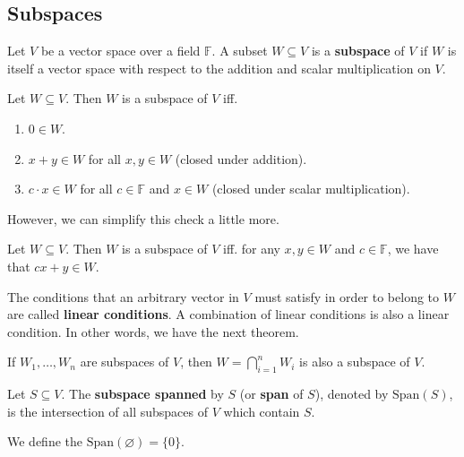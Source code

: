 \subsection{Subspaces}

\begin{definition}[Subspace]
	Let $V$ be a vector space over a field $\mathbb{F}$. A subset $W \subseteq V$ is a \textbf{subspace} of $V$ if $W$ is itself a vector space with respect to the addition and scalar multiplication on $V$.	
\end{definition}

\begin{theorem}
	Let $W \subseteq V$. Then $W$ is a subspace of $V$ iff.
	\begin{enumerate}
		\item $0 \in W$.
		\item $x+y \in W$ for all $x,y \in W$ (closed under addition).
		\item $c \cdot x \in W$ for all $c \in \mathbb{F}$ and $x \in W$ (closed under scalar multiplication).
	\end{enumerate}
\end{theorem}

However, we can simplify this check a little more.

\begin{theorem}
	Let $W \subseteq V$. Then $W$ is a subspace of $V$ iff. for any $x, y \in W$ and $c \in \mathbb{F}$, we have that $cx+y \in W$.
\end{theorem}

The conditions that an arbitrary vector in $V$ must satisfy in order to belong to $W$ are called \textbf{linear conditions}. A combination of linear conditions is also a linear condition. In other words, we have the next theorem.

\begin{theorem}
	If $W_1, \ldots, W_n$ are subspaces of $V$, then $W = \bigcap_{i=1}^n W_i$ is also a subspace of $V$. 
\end{theorem}

\begin{definition}[Span]
	Let $S \subseteq V$. The \textbf{subspace spanned} by $S$ (or \textbf{span} of $S$), denoted by $\text{Span}(S)$, is the intersection of all subspaces of $V$ which contain $S$.
	
	We define the $\text{Span}(\varnothing) = \{ 0 \}$.
\end{definition}

